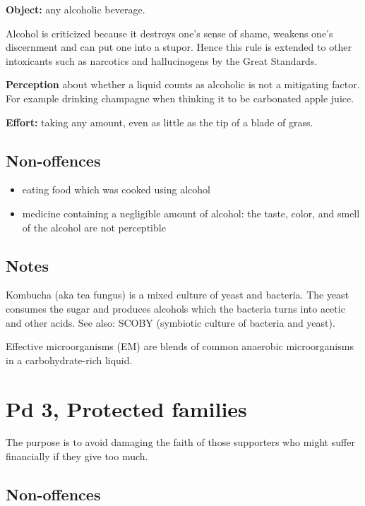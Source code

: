 \textbf{Object:} any alcoholic beverage.

Alcohol is criticized because it destroys one's sense of shame, weakens
one's discernment and can put one into a stupor. Hence this rule is
extended to other intoxicants such as narcotics and hallucinogens by the
Great Standards.

\textbf{Perception} about whether a liquid counts as alcoholic is not a
mitigating factor. For example drinking champagne when thinking it to be
carbonated apple juice.

\textbf{Effort:} taking any amount, even as little as the tip of a blade
of grass.

\subsection{Non-offences}

\begin{itemize}
\tightlist
\item
  eating food which was cooked using alcohol
\item
  medicine containing a negligible amount of alcohol: the taste, color,
  and smell of the alcohol are not perceptible
\end{itemize}

\subsection{Notes}

Kombucha (aka tea fungus) is a mixed culture of yeast and bacteria. The
yeast consumes the sugar and produces alcohols which the bacteria turns
into acetic and other acids. See also: SCOBY (symbiotic culture of
bacteria and yeast).

Effective microorganisms (EM) are blends of common anaerobic
microorganisms in a carbohydrate-rich liquid.

\clearpage

\section{Pd 3, Protected families}

The purpose is to avoid damaging the faith of those supporters who might
suffer financially if they give too much.

\subsection{Non-offences}

